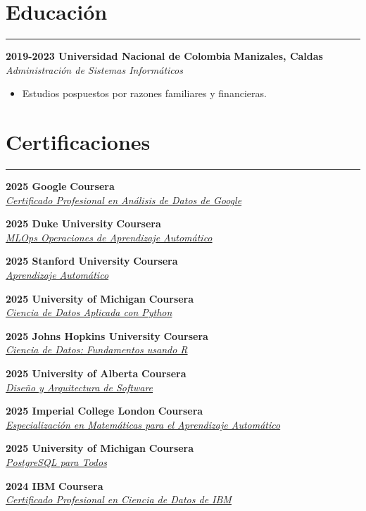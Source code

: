 \documentclass[9pt,a4paper]{article}
\newcommand{\cvevent}[4]{%
  {\noindent \textbf{#1 #2} \hfill \textbf{#3}\\%
   \textit{#4}\\[0pt]}%
}
\begin{document}
\section*{Educación}
\vspace{-\baselineskip}
\noindent\rule{\linewidth}{0.5pt}

\cvevent{2019-2023}{Universidad Nacional de Colombia}{Manizales, Caldas}{Administración de Sistemas Informáticos}
\vspace{-\baselineskip}
\begin{itemize}[noitemsep, topsep=0pt]
    \item Estudios pospuestos por razones familiares y financieras.
\end{itemize}

\section*{Certificaciones}
\vspace{-\baselineskip}
\noindent\rule{\linewidth}{0.5pt}

\cvevent{2025}{Google}{Coursera}{\href{https://www.credly.com/badges/017b44b1-847d-4519-a2d6-8b8ab2af6bb4}{Certificado Profesional en Análisis de Datos de Google}}
\cvevent{2025}{Duke University}{Coursera}{\href{https://www.coursera.org/account/accomplishments/specialization/9GW0O26FOENS}{MLOps \textbar{} Operaciones de Aprendizaje Automático}}
\cvevent{2025}{Stanford University}{Coursera}{\href{https://www.coursera.org/account/accomplishments/specialization/AC7NFFS0WXWP}{Aprendizaje Automático}}
\cvevent{2025}{University of Michigan}{Coursera}{\href{https://www.coursera.org/account/accomplishments/specialization/YVQ1D5MLFDQU}{Ciencia de Datos Aplicada con Python}}
\cvevent{2025}{Johns Hopkins University}{Coursera}{\href{https://www.coursera.org/account/accomplishments/specialization/MI5FUPDVP8JW}{Ciencia de Datos: Fundamentos usando R}}
\cvevent{2025}{University of Alberta}{Coursera}{\href{https://www.coursera.org/account/accomplishments/specialization/PMJQNHZRUFV0}{Diseño y Arquitectura de Software}}
\cvevent{2025}{Imperial College London}{Coursera}{\href{https://www.coursera.org/account/accomplishments/specialization/D7GUABT9DHUU}{Especialización en Matemáticas para el Aprendizaje Automático}}
\cvevent{2025}{University of Michigan}{Coursera}{\href{https://www.coursera.org/account/accomplishments/specialization/8KBK5UWK2HFK}{PostgreSQL para Todos}}
\cvevent{2024}{IBM}{Coursera}{\href{https://www.credly.com/badges/eeb6412f-cdff-4324-8399-8e6ca143ef9b}{Certificado Profesional en Ciencia de Datos de IBM}}
\vspace{-\baselineskip}
\end{document}

